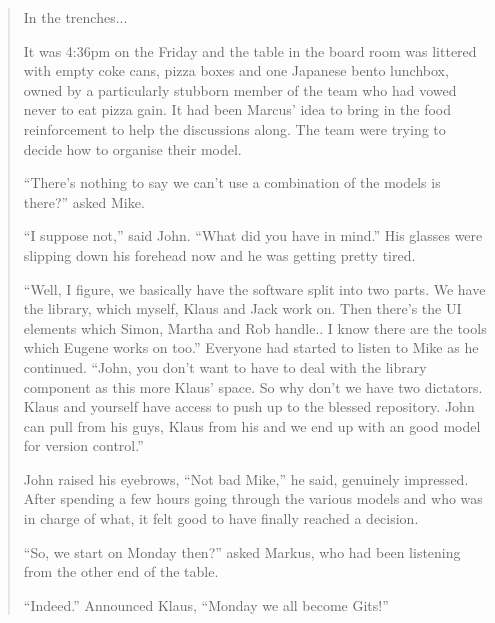 \begin{quote}In the trenches...

It was 4:36pm on the Friday and the table in the board room was littered with empty coke cans, pizza boxes and one Japanese bento lunchbox, owned by a particularly stubborn member of the team who had vowed never to eat pizza gain.  It had been Marcus' idea to bring in the food reinforcement to help the discussions along.  The team were trying to decide how to organise their model.

``There's nothing to say we can't use a combination of the models is there?'' asked Mike.

``I suppose not,'' said John.  ``What did you have in mind.''  His glasses were slipping down his forehead now and he was getting pretty tired.

``Well, I figure, we basically have the software split into two parts.  We have the library, which myself, Klaus and Jack work on.  Then there's the UI elements which Simon, Martha and Rob handle..  I know there are the tools which Eugene works on too.''  Everyone had started to listen to Mike as he continued.  ``John, you don't want to have to deal with the library component as this more Klaus' space.  So why don't we have two dictators.  Klaus and yourself have access to push up to the blessed repository.  John can pull from his guys, Klaus from his and we end up with an good model for version control.''

John raised his eyebrows, ``Not bad Mike,'' he said, genuinely impressed.  After spending a few hours going through the various models and who was  in charge of what, it felt good to have finally reached a decision.

``So, we start on Monday then?'' asked Markus, who had been listening from the other end of the table.  

``Indeed.''  Announced Klaus, ``Monday we all become Gits!''
\end{quote}
